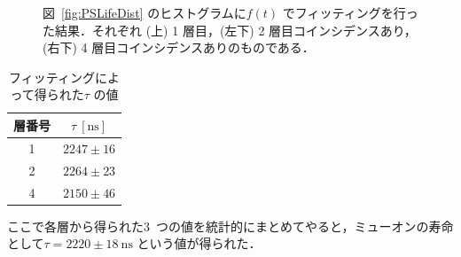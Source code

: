 \begin{figure}[h]
\begin{minipage}{0.45\textwidth}
	\end{minipage}
	\caption{図~\ref{fig:PSLifeDist} のヒストグラムに$f(t)$ でフィッティングを行った結果．それぞれ (上) 1 層目，(左下) 2 層目コインシデンスあり，(右下) 4 層目コインシデンスありのものである．}
	\label{fig:PSLifeFit}
\end{figure}%
\begin{table}[h]
	\centering
	\caption{フィッティングによって得られた$\tau$ の値}
	\begin{tabular}{cc}\toprule
	層番号 & $\tau~[\mathrm{ns}]$ \\ \midrule
	1 & $2247 \pm 16$ \\
	2 & $2264 \pm 23$ \\
	4 & $2150 \pm 46$ \\ \bottomrule
	\end{tabular}\label{tab:PSLifetime}
\end{table}%

ここで各層から得られた3~つの値を統計的にまとめてやると，ミューオンの寿命として$\tau = 2220 \pm 18~\mathrm{ns}$ という値が得られた．

\newpage

